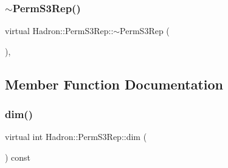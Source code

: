 \subsubsection{\texorpdfstring{$\sim$PermS3Rep()}{~PermS3Rep()}\hspace{0.1cm}{\footnotesize\ttfamily [3/3]}}
{\footnotesize\ttfamily virtual Hadron\+::\+Perm\+S3\+Rep\+::$\sim$\+Perm\+S3\+Rep (\begin{DoxyParamCaption}{ }\end{DoxyParamCaption})\hspace{0.3cm}{\ttfamily [inline]}, {\ttfamily [virtual]}}



\subsection{Member Function Documentation}
\mbox{\label{structHadron_1_1PermS3Rep_a4ce8c9c9367b6120769feae38d2f5372}} 
\subsubsection{\texorpdfstring{dim()}{dim()}\hspace{0.1cm}{\footnotesize\ttfamily [1/3]}}
{\footnotesize\ttfamily virtual int Hadron\+::\+Perm\+S3\+Rep\+::dim (\begin{DoxyParamCaption}{ }\end{DoxyParamCaption}) const\hspace{0.3cm}{\ttfamily [pure virtual]}}



